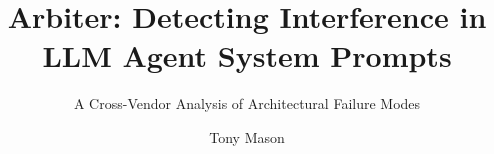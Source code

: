 \documentclass[sigplan,screen,nonacm]{acmart}
\begin{document}
\title{Arbiter: Detecting Interference in LLM Agent System Prompts}
\subtitle{A Cross-Vendor Analysis of Architectural Failure Modes}

\author{Tony Mason}

\begin{abstract}

\end{abstract}

\maketitle








\appendix




\end{document}
